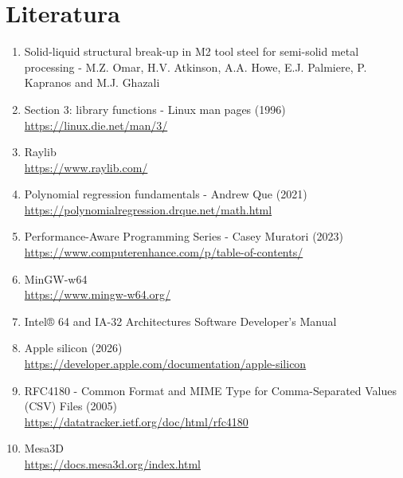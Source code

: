 \documentclass[12pt]{report}
\begin{document}
	\chapter{Literatura}
	\begin{enumerate}
		\item Solid-liquid structural break-up in M2 tool steel for semi-solid metal processing - M.Z. Omar, H.V. Atkinson, A.A. Howe, E.J. Palmiere, P. Kapranos and M.J. Ghazali
		
		\item Section 3: library functions - Linux man pages (1996) \\
		\url{https://linux.die.net/man/3/}
		
		\item Raylib \\
		\url{https://www.raylib.com/}
		
		\item Polynomial regression fundamentals - Andrew Que (2021) \\
		\url{https://polynomialregression.drque.net/math.html}
		
		\item Performance-Aware Programming Series - Casey Muratori (2023) \\
		\url{https://www.computerenhance.com/p/table-of-contents/}
		
		\item MinGW-w64 \\
		\url{https://www.mingw-w64.org/}
		
		\item Intel® 64 and IA-32 Architectures Software Developer’s Manual
		
		\item Apple silicon (2026) \\
		\url{https://developer.apple.com/documentation/apple-silicon}
		
		\item RFC4180 - Common Format and MIME Type for Comma-Separated Values (CSV) Files (2005) \\
		\url{https://datatracker.ietf.org/doc/html/rfc4180}
		
		\item Mesa3D \\
		\url{https://docs.mesa3d.org/index.html}
		
	\end{enumerate}
	
\end{document}
